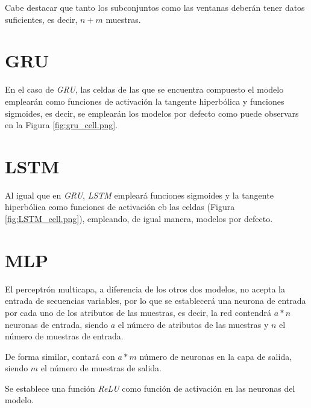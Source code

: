 Cabe destacar que tanto los subconjuntos como las ventanas deberán tener datos 
suficientes, es decir, \(n + m\) muestras.

\newpage

\section{GRU}
En el caso de \textit{GRU}, las celdas de las que se encuentra compuesto el modelo 
emplearán como funciones de activación la tangente hiperbólica y funciones sigmoides, 
es decir, se emplearán los modelos por defecto como puede observars en la Figura 
\ref{fig:gru_cell.png}.


\section{LSTM}
Al igual que en \textit{GRU}, \textit{LSTM} empleará funciones sigmoides y la 
tangente hiperbólica como funciones de activación eb las celdas (Figura \ref{fig:LSTM_cell.png}),
empleando, de igual manera, modelos por defecto.


\section{MLP}
El perceptrón multicapa, a diferencia de los otros dos modelos, no acepta
la entrada de secuencias variables, por lo que se establecerá una neurona de entrada
por cada uno de los atributos de las muestras, es decir, la red contendrá
\(a * n\) neuronas de entrada, siendo \(a\) el número de atributos de las muestras y
\(n\) el número de muestras de entrada.

De forma similar, contará con \(a * m\) número de neuronas en la capa de salida, siendo
\(m\) el número de muestras de salida.


Se establece una función \textit{ReLU} como función de activación en las neuronas del
modelo.

